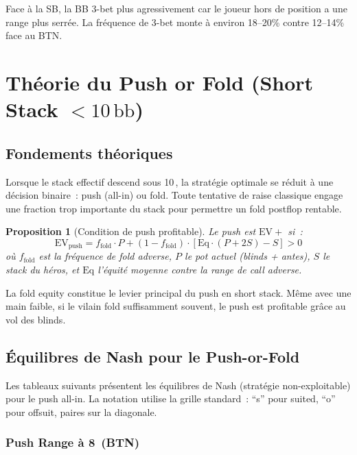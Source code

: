 \documentclass[a4paper,11pt]{article}
\newtheorem{proposition}{Proposition}[section]
\newcommand{\EV}{\mathrm{EV}}
\newcommand{\Eq}{\mathrm{Eq}}
\newcommand{\bb}{\,\mathrm{bb}}
\begin{document}
Face \`a la SB, la BB 3-bet plus agressivement car le joueur hors de position a une range plus serr\'ee. La fr\'equence de 3-bet monte \`a environ 18--20\% contre 12--14\% face au BTN.


\newpage
\section{Th\'eorie du Push or Fold (Short Stack $<10\bb$)}

\subsection{Fondements th\'eoriques}

Lorsque le stack effectif descend sous 10\bb, la strat\'egie optimale se r\'eduit \`a une d\'ecision binaire~: push (all-in) ou fold. Toute tentative de raise classique engage une fraction trop importante du stack pour permettre un fold postflop rentable.

\begin{proposition}[Condition de push profitable]
Le push est $\EV+$ si~:
\begin{equation}
\EV_{\text{push}} = f_{\text{fold}} \cdot P + (1 - f_{\text{fold}}) \cdot \left[\Eq \cdot (P + 2S) - S \right] > 0
\label{eq:ev_push}
\end{equation}
o\`u $f_{\text{fold}}$ est la fr\'equence de fold adverse, $P$ le pot actuel (blinds + antes), $S$ le stack du h\'eros, et $\Eq$ l'\'equit\'e moyenne contre la range de call adverse.
\end{proposition}

La fold equity constitue le levier principal du push en short stack. M\^eme avec une main faible, si le vilain fold suffisamment souvent, le push est profitable gr\^ace au vol des blinds.

\subsection{\'Equilibres de Nash pour le Push-or-Fold}

Les tableaux suivants pr\'esentent les \'equilibres de Nash (strat\'egie non-exploitable) pour le push all-in. La notation utilise la grille standard~: ``s'' pour suited, ``o'' pour offsuit, paires sur la diagonale.

\subsubsection{Push Range \`a 8\bb{} (BTN)}
\end{document}
